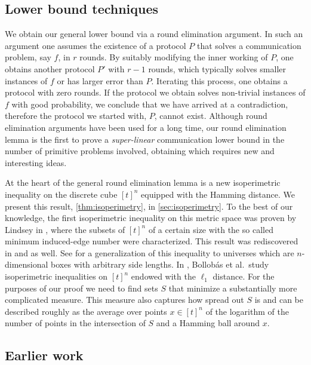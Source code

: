 \subsection{Lower bound techniques}

We obtain our general lower bound via a round elimination
argument. In such an argument one assumes the existence of a
protocol $P$ that solves a communication problem, say $f$, in
$r$ rounds. By suitably modifying the inner working of $P$, one
obtains another protocol $P'$ with $r-1$ rounds, which typically
solves smaller instances of $f$ or has larger error than $P$.
Iterating this process, one obtains a protocol with zero rounds.
If the protocol we obtain solves non-trivial instances of $f$
with good probability, we conclude that we have arrived at a
contradiction, therefore the protocol we started with, $P$,
cannot exist. Although round elimination arguments have been
used for a long time, our round elimination lemma is the first
to prove a {\em super-linear} communication lower bound in the
number of primitive problems involved, obtaining which requires
new and interesting ideas.

At the heart of the general round elimination lemma is a new
isoperimetric inequality on the discrete cube $[t]^n$ equipped
with the Hamming distance. We present this result,
\autoref{thm:isoperimetry}, in \autoref{sec:isoperimetry}. To
the best of our knowledge, the first isoperimetric inequality on
this metric space was proven by Lindsey in \cite{Lindsey1964},
where the subsets of $[t]^n$ of a certain size with the so
called minimum induced-edge number were characterized. This
result was rediscovered in \cite{KleitmanKR1971} and
\cite{Clements1971} as well. See \cite{AzizogluO2003} for a
generalization of this inequality to universes which are
$n$-dimensional boxes with arbitrary side lengths. In
\cite{BollobasL1991}, Bollobás et al.\ study isoperimetric
inequalities on $[t]^n$ endowed with the $\ell_1$ distance. For
the purposes of our proof we need to find sets $S$ that minimize
a substantially more complicated measure. This measure also
captures how spread out $S$ is and can be described roughly as
the average over points $x\in[t]^n$ of the logarithm of the
number of points in the intersection of $S$ and a Hamming ball
around $x$.

\subsection{Earlier work}
\label{sec:intro:earlier}

